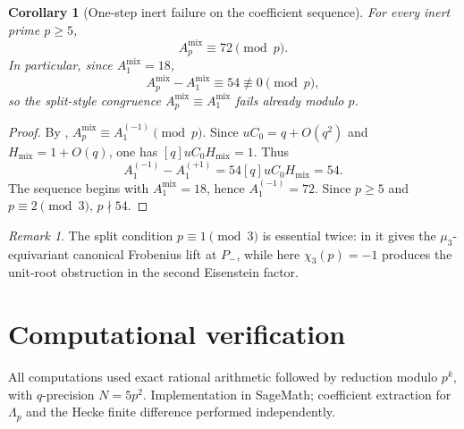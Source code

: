 \documentclass[11pt]{amsart}
\newtheorem{corollary}[theorem]{Corollary}
\theoremstyle{definition}
\theoremstyle{remark}
\newtheorem{remark}[theorem]{Remark}
\begin{document}
\begin{corollary}[One-step inert failure on the coefficient sequence]\label{cor:inert-Ap}
For every inert prime \(p\ge5\),
\[
A_p^{\mathrm{mix}}\equiv72\pmod p.
\]
In particular, since \(A_1^{\mathrm{mix}}=18\),
\[
A_p^{\mathrm{mix}}-A_1^{\mathrm{mix}}\equiv54\not\equiv0\pmod p,
\]
so the split-style congruence \(A_p^{\mathrm{mix}}\equiv A_1^{\mathrm{mix}}\) fails already modulo \(p\).
\end{corollary}

\begin{proof}
By , \(A_p^{\mathrm{mix}}\equiv A_1^{(-1)}\pmod p\). Since \(uC_0=q+O(q^2)\) and \(H_{\mathrm{mix}}=1+O(q)\), one has \([q]uC_0H_{\mathrm{mix}}=1\). Thus
\[
A_1^{(-1)}-A_1^{(+1)}=54[q]uC_0H_{\mathrm{mix}}=54.
\]
The sequence begins with \(A_1^{\mathrm{mix}}=18\), hence \(A_1^{(-1)}=72\). Since \(p\ge5\) and \(p\equiv2\pmod3\), \(p\nmid54\).
\end{proof}

\begin{remark}
The split condition $p\equiv 1\pmod 3$ is essential twice: in  it gives the $\mu_3$-equivariant canonical Frobenius lift at $P_-$, while here $\chi_3(p)=-1$ produces the unit-root obstruction in the second Eisenstein factor.
\end{remark}

\section{Computational verification}\label{sec:comp}

All computations used exact rational arithmetic followed by reduction modulo $p^k$, with $q$-precision $N=5p^2$. Implementation in SageMath; coefficient extraction for $\Lambda_p$ and the Hecke finite difference performed independently.
\end{document}
